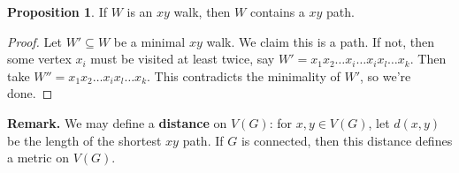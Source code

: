 \documentclass{article}
\theoremstyle{definition}
\newtheorem{prop}[theorem]{Proposition}
\begin{document}
\vspace{1mm}

\begin{prop}
    If $W$ is an $xy$ walk, then $W$ contains a $xy$ path.
\end{prop}
\begin{proof}
Let $W' \subseteq W$ be a minimal $xy$ walk. We claim this is a path. If not, then some vertex $x_i$ must be visited at least twice, say $W' = x_1x_2\ldots x_i \ldots x_i x_l \ldots x_k$. Then take $W'' = x_1x_2\ldots x_i x_l \ldots x_k$. This contradicts the minimality of $W'$, so we're done.
\end{proof}


\textbf{Remark.} We may define a \textbf{distance} on $V(G)$: for $x,y \in V(G)$, let $d(x,y)$ be the length of the shortest $xy$ path. If $G$ is connected, then this distance defines a metric on $V(G)$. 
\end{document}

